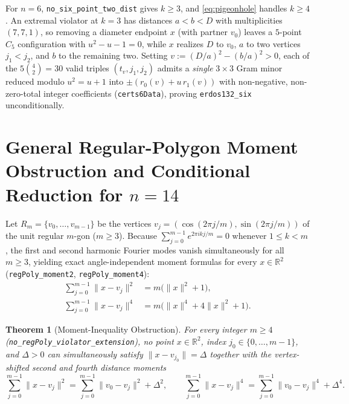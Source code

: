 \documentclass[11pt,reqno]{amsart}
\newtheorem{theorem}{Theorem}[section]
\theoremstyle{definition}
\newcommand{\R}{\mathbb{R}}
\begin{document}
For $n = 6$, \texttt{no\_six\_point\_two\_dist} gives $k \ge 3$, and \eqref{eq:pigeonhole} handles $k \ge 4$. An extremal violator at $k = 3$ has distances $a < b < D$ with multiplicities $(7, 7, 1)$, so removing a diameter endpoint $x$ (with partner $v_0$) leaves a $5$-point $C_5$ configuration with $u^2 - u - 1 = 0$, while $x$ realizes $D$ to $v_0$, $a$ to two vertices $j_1 < j_2$, and $b$ to the remaining two. Setting $v := (D/a)^2 - (b/a)^2 > 0$, each of the $5\binom{4}{2}=30$ valid triples $(t_v, j_1, j_2)$ admits a \emph{single} $3 \times 3$ Gram minor reduced modulo $u^2 = u + 1$ into $\pm(r_0(v) + u\,r_1(v))$ with non-negative, non-zero-total integer coefficients (\texttt{certs6Data}), proving \texttt{erdos132\_six} unconditionally.

\section{General Regular-Polygon Moment Obstruction and Conditional Reduction for \texorpdfstring{$n = 14$}{n = 14}}

Let $R_m = \{v_0, \dots, v_{m-1}\}$ be the vertices $v_j = (\cos(2\pi j/m), \sin(2\pi j/m))$ of the unit regular $m$-gon ($m \ge 3$). Because $\sum_{j=0}^{m-1} e^{2\pi i k j / m} = 0$ whenever $1 \le k < m$, the first and second harmonic Fourier modes vanish simultaneously for all $m \ge 3$, yielding exact angle-independent moment formulas for every $x \in \R^2$ (\texttt{regPoly\_moment2}, \texttt{regPoly\_moment4}):
\begin{align}
\sum_{j=0}^{m-1} \|x - v_j\|^2 &= m\bigl(\|x\|^2 + 1\bigr), \label{eq:mom2}\\
\sum_{j=0}^{m-1} \|x - v_j\|^4 &= m\bigl(\|x\|^4 + 4\|x\|^2 + 1\bigr). \label{eq:mom4}
\end{align}

\begin{theorem}[Moment-Inequality Obstruction]\label{thm:regpoly}
For every integer $m \ge 4$ (\texttt{no\_regPoly\_violator\_extension}), no point $x \in \R^2$, index $j_0 \in \{0, \dots, m-1\}$, and $\Delta > 0$ can simultaneously satisfy $\|x - v_{j_0}\| = \Delta$ together with the vertex-shifted second and fourth distance moments
\[
\sum_{j=0}^{m-1} \|x - v_j\|^2 = \sum_{j=0}^{m-1} \|v_0 - v_j\|^2 + \Delta^2, \qquad
\sum_{j=0}^{m-1} \|x - v_j\|^4 = \sum_{j=0}^{m-1} \|v_0 - v_j\|^4 + \Delta^4.
\]
\end{theorem}
\end{document}

